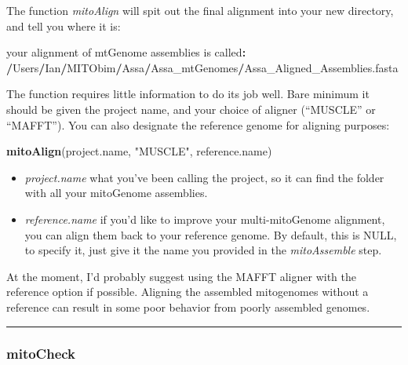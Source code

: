 \documentclass[]{article}
\newenvironment{Shaded}{\begin{snugshade}}{\end{snugshade}}
\newcommand{\ErrorTok}[1]{\textcolor[rgb]{0.64,0.00,0.00}{\textbf{#1}}}
\newcommand{\KeywordTok}[1]{\textcolor[rgb]{0.13,0.29,0.53}{\textbf{#1}}}
\newcommand{\NormalTok}[1]{#1}
\newcommand{\OperatorTok}[1]{\textcolor[rgb]{0.81,0.36,0.00}{\textbf{#1}}}
\newcommand{\StringTok}[1]{\textcolor[rgb]{0.31,0.60,0.02}{#1}}
\providecommand{\tightlist}{%
  \setlength{\itemsep}{0pt}\setlength{\parskip}{0pt}}
\renewcommand{\linethickness}{0.05em}
\begin{document}
The function \emph{mitoAlign} will spit out the final alignment into
your new directory, and tell you where it is:

\begin{Shaded}
\begin{Highlighting}[]
\NormalTok{your alignment of mtGenome assemblies is called}\OperatorTok{:}
\StringTok{  }\ErrorTok{/}\NormalTok{Users}\OperatorTok{/}\NormalTok{Ian}\OperatorTok{/}\NormalTok{MITObim}\OperatorTok{/}\NormalTok{Assa}\OperatorTok{/}\NormalTok{Assa_mtGenomes}\OperatorTok{/}\NormalTok{Assa_Aligned_Assemblies.fasta}
\end{Highlighting}
\end{Shaded}

The function requires little information to do its job well. Bare
minimum it should be given the project name, and your choice of aligner
(``MUSCLE'' or ``MAFFT''). You can also designate the reference genome
for aligning purposes:

\begin{Shaded}
\begin{Highlighting}[]
\KeywordTok{mitoAlign}\NormalTok{(project.name, }\StringTok{"MUSCLE"}\NormalTok{, reference.name)}
\end{Highlighting}
\end{Shaded}

\begin{itemize}
\tightlist
\item
  \emph{project.name} what you've been calling the project, so it can
  find the folder with all your mitoGenome assemblies.\\
\item
  \emph{reference.name} if you'd like to improve your multi-mitoGenome
  alignment, you can align them back to your reference genome. By
  default, this is NULL, to specify it, just give it the name you
  provided in the \emph{mitoAssemble} step.
\end{itemize}

At the moment, I'd probably suggest using the MAFFT aligner with the
reference option if possible. Aligning the assembled mitogenomes without
a reference can result in some poor behavior from poorly assembled
genomes.

\begin{center}\rule{0.5\linewidth}{\linethickness}\end{center}

\hypertarget{mitocheck}{%
\subsubsection{mitoCheck}\label{mitocheck}}
\end{document}

